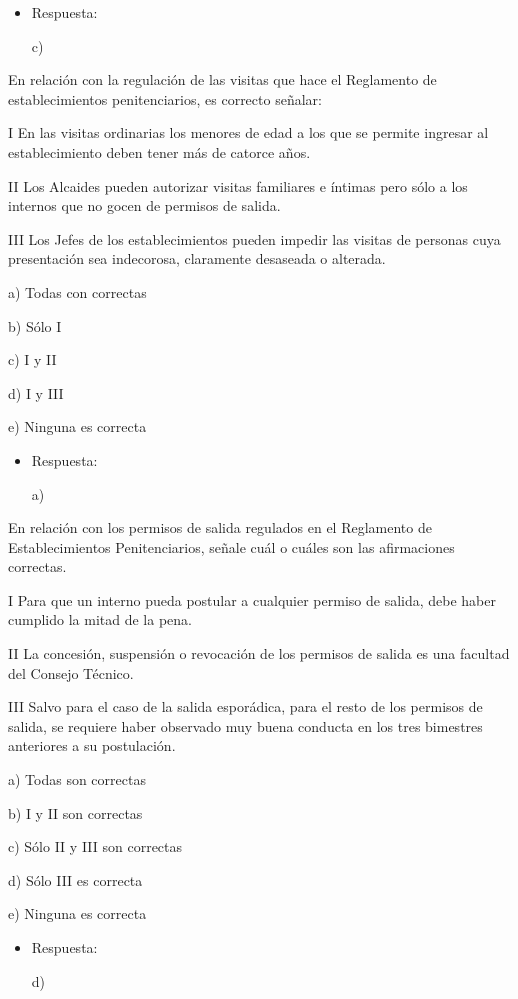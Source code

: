 \documentclass[letterpaper, 11pt]{article}
\begin{document}
\begin{itemize}
\item Respuesta:

c)
\end{itemize}


En relación con la regulación de las visitas que hace el Reglamento de
establecimientos penitenciarios, es correcto señalar:


I En las visitas ordinarias los menores de edad a los que se permite
ingresar al establecimiento deben tener más de catorce años.

II Los Alcaides pueden autorizar visitas familiares e íntimas pero
sólo a los internos que no gocen de permisos de salida.

III Los Jefes de los establecimientos pueden impedir las visitas de
personas cuya presentación sea indecorosa, claramente desaseada o
alterada.


a) Todas con correctas

b) Sólo I

c) I y II

d) I y III

e) Ninguna es correcta

\begin{itemize}
\item Respuesta:

a)
\end{itemize}


En relación con los permisos de salida regulados en el Reglamento de
Establecimientos Penitenciarios, señale cuál o cuáles son las
afirmaciones correctas.

I Para que un interno pueda postular a cualquier permiso de salida,
debe haber cumplido la mitad de la pena.

II La concesión, suspensión o revocación de los permisos de salida es
una facultad del Consejo Técnico.

III Salvo para el caso de la salida esporádica, para el resto de los
permisos de salida, se requiere haber observado muy buena conducta en
los tres bimestres anteriores a su postulación.

a) Todas son correctas

b) I y II son correctas

c) Sólo II y III son correctas

d) Sólo III es correcta

e) Ninguna es correcta

\begin{itemize}
\item Respuesta:

d)
\end{itemize}
\end{document}
